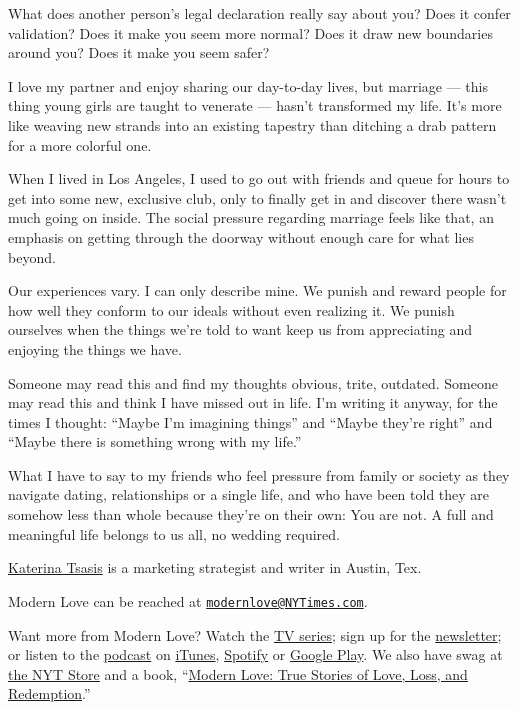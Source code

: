 What does another person's legal declaration really say about you? Does
it confer validation? Does it make you seem more normal? Does it draw
new boundaries around you? Does it make you seem safer?

I love my partner and enjoy sharing our day-to-day lives, but marriage
--- this thing young girls are taught to venerate --- hasn't transformed
my life. It's more like weaving new strands into an existing tapestry
than ditching a drab pattern for a more colorful one.

When I lived in Los Angeles, I used to go out with friends and queue for
hours to get into some new, exclusive club, only to finally get in and
discover there wasn't much going on inside. The social pressure
regarding marriage feels like that, an emphasis on getting through the
doorway without enough care for what lies beyond.

Our experiences vary. I can only describe mine. We punish and reward
people for how well they conform to our ideals without even realizing
it. We punish ourselves when the things we're told to want keep us from
appreciating and enjoying the things we have.

Someone may read this and find my thoughts obvious, trite, outdated.
Someone may read this and think I have missed out in life. I'm writing
it anyway, for the times I thought: ``Maybe I'm imagining things'' and
``Maybe they're right'' and ``Maybe there is something wrong with my
life.''

What I have to say to my friends who feel pressure from family or
society as they navigate dating, relationships or a single life, and who
have been told they are somehow less than whole because they're on their
own: You are not. A full and meaningful life belongs to us all, no
wedding required.

\href{https://www.kt.marketing/}{Katerina Tsasis} is a marketing
strategist and writer in Austin, Tex.

Modern Love can be reached at
\href{mailto:modernlove@NYTimes.com}{\nolinkurl{modernlove@NYTimes.com}}.

Want more from Modern Love? Watch the
\href{https://www.nytimes3xbfgragh.onion/2019/09/12/style/modern-love-tv-show-trailer.html}{TV
series}; sign up for the
\href{https://www.nytimes3xbfgragh.onion/newsletters/love-letter}{newsletter};
or listen to the
\href{https://www.nytimes3xbfgragh.onion/column/modern-love-podcast}{podcast}
on
\href{https://itunes.apple.com/us/podcast/modern-love/id1065559535?mt=2\&version=meter+at+0\&module=meter-Links\&pgtype=article\&contentId=\&mediaId=\&referrer=\&priority=true\&action=click\&contentCollection=meter-links-click}{iTunes},
\href{https://open.spotify.com/show/03Er7mSPq9IEewOgbPD3vO}{Spotify} or
\href{https://play.google.com/music/listen?u=0\#/ps/Iktqjbkz7bychbnofblw32dik64}{Google
Play}. We also have swag at
\href{https://store.nytimes3xbfgragh.onion/collections/modern-love}{the
NYT Store} and a book,
``\href{https://www.penguinrandomhouse.com/books/623036/modern-love-revised-and-updated-by-edited-by-daniel-jones-with-contributions-by-andrew-rannells-ayelet-waldman-amy-krouse-rosenthal-veronica-chambers-and-more/}{Modern
Love: True Stories of Love, Loss, and Redemption}.''

